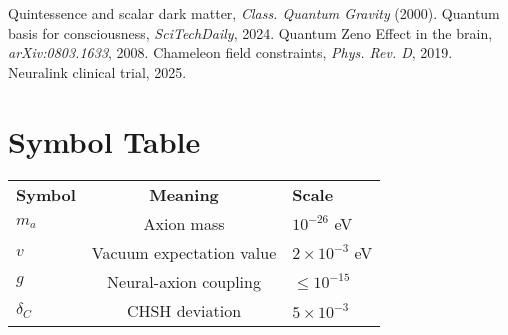 \documentclass[11pt,a4paper]{article}
\begin{document}
\begin{thebibliography}{9}
 Quintessence and scalar dark matter, \textit{Class. Quantum Gravity} (2000).
 Quantum basis for consciousness, \textit{SciTechDaily}, 2024.
 Quantum Zeno Effect in the brain, \textit{arXiv:0803.1633}, 2008.
 Chameleon field constraints, \textit{Phys. Rev. D}, 2019.
 Neuralink clinical trial, 2025.
\end{thebibliography}

\appendix

\section{Symbol Table}
\begin{tabular}{lcl}
\textbf{Symbol} & \textbf{Meaning} & \textbf{Scale} \\
$m_a$ & Axion mass & $10^{-26}$ eV \\
$v$ & Vacuum expectation value & $2 \times 10^{-3}$ eV \\
$g$ & Neural-axion coupling & $\leq 10^{-15}$ \\
$\delta_C$ & CHSH deviation & $5 \times 10^{-3}$ \\
\end{tabular}
\end{document}
